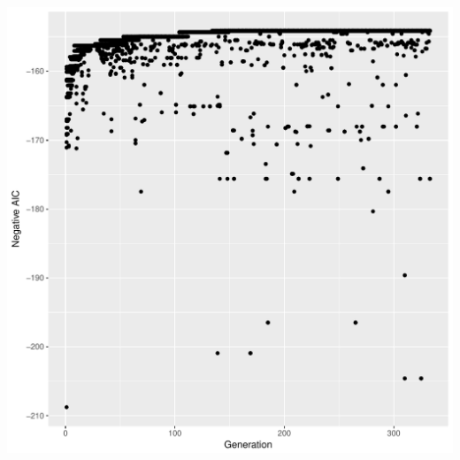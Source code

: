 \documentclass{article}\usepackage[]{graphicx}\usepackage[]{color}
\makeatletter
\def\maxwidth{ %
  \ifdim\Gin@nat@width>\linewidth
    \linewidth
  \else
    \Gin@nat@width
  \fi
}
\newenvironment{knitrout}{}{} %
\makeatother
\begin{document}
\begin{knitrout}
\includegraphics[width=\maxwidth]{figure/unnamed-chunk-1-2} 


\end{knitrout}
\end{document}
